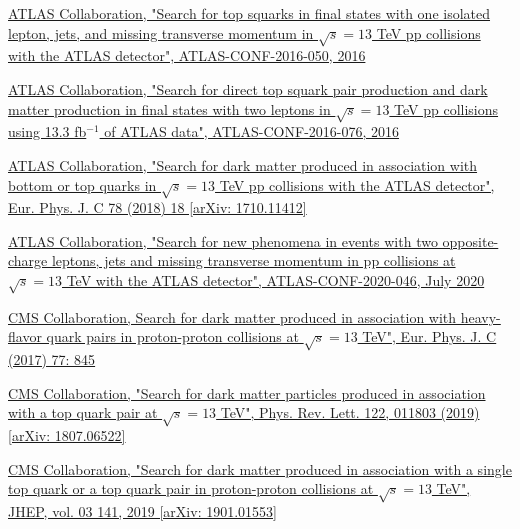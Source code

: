 \documentclass[a4paper, 10pt, openright]{report}
\begin{document}
\begin{thebibliography}{1}

\href{http://inspirehep.net/record/1480030/}{ATLAS Collaboration,
"Search for top squarks in final states with one isolated lepton, jets, and missing transverse momentum in $\sqrt{s} = 13$ TeV pp collisions with the ATLAS detector",
ATLAS-CONF-2016-050, 2016}

\href{http://inspirehep.net/record/1480056}{ATLAS Collaboration,
"Search for direct top squark pair production and dark matter production in final states with two leptons in $\sqrt{s} = 13$ TeV pp collisions using 13.3 fb$^{-1}$ of ATLAS data",
ATLAS-CONF-2016-076, 2016}

\href{https://arxiv.org/abs/1710.11412}{ATLAS Collaboration,
"Search for dark matter produced in association with bottom or top quarks in $\sqrt{s} = 13$ TeV pp collisions with the ATLAS detector",
Eur. Phys. J. C 78 (2018) 18 [arXiv: 1710.11412]}

\href{https://atlas.web.cern.ch/Atlas/GROUPS/PHYSICS/CONFNOTES/ATLAS-CONF-2020-046/ATLAS-CONF-2020-046.pdf}{ATLAS Collaboration,
"Search for new phenomena in events with two opposite-charge leptons, jets and missing transverse momentum in pp collisions at $\sqrt{s} = 13$ TeV with the ATLAS detector",
ATLAS-CONF-2020-046, July 2020}

\href{http://inspirehep.net/record/1603635}{CMS Collaboration,
Search for dark matter produced in association with heavy-flavor quark pairs in proton-proton collisions at $\sqrt{s} = 13$ TeV",
Eur. Phys. J. C (2017) 77: 845}

\href{https://arxiv.org/abs/1807.06522}{CMS Collaboration,
"Search for dark matter particles produced in association with a top quark pair at $\sqrt{s} = 13$ TeV",
Phys. Rev. Lett. 122, 011803 (2019) [arXiv: 1807.06522]}

\href{https://arxiv.org/abs/1901.01553}{CMS Collaboration,
"Search for dark matter produced in association with a single top quark or a top quark pair in proton-proton collisions at $\sqrt{s} = 13$ TeV",
JHEP, vol. 03 141, 2019 [arXiv: 1901.01553]}


\end{thebibliography}
\end{document}
